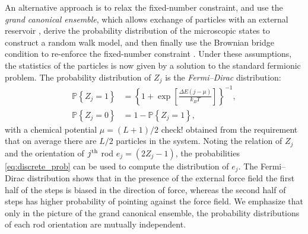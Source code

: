\documentclass[aps,showpacs,twocolumn,floatfix,prx,superscriptaddress]{revtex4-1}
\begin{document}
An alternative approach is to relax the fixed-number constraint, and use
the \emph{grand canonical ensemble}, which allows exchange of particles with
an external reservoir \cite{Chandler1987,Huang2001}, derive the probability
distribution of the microscopic states to construct a random walk model, and
then finally use the Brownian bridge condition to re-enforce the fixed-number constraint
\cite{Lin2015}. Under these assumptions, the statistics of the particles is now given by a solution to the standard fermionic problem.
The probability distribution of $Z_j$  is the {\em Fermi--Dirac} distribution:
\cite{Chandler1987,Lin2015}
\begin{subequations}
    \label{eq:discrete_prob}
    \begin{align}
        \mathbb{P} \left\{ Z_j = 1\right\} & =  \left\{1+\exp\left[\frac{ \Delta
                    E \left(j - \mu \right) }{k_B T}\right]\right\}^{-1}, \\
        \mathbb{P} \left\{ Z_j = 0\right\} & = 1 - \mathbb{P} \left\{ Z_j =
            1\right\},
    \end{align}
\end{subequations}
with a chemical potential $\mu = (L+1)/2$ {\color{red} check!} obtained from the requirement that on average there are $L/2$ particles in the system.
Noting the relation of $Z_j$ and the orientation of $j^{\rm
    th}$ rod $e_j = \left(2Z_j -1\right)$, the probabilities
\eqref{eq:discrete_prob} can be used to compute the distribution of $e_j$. The Fermi--Dirac distribution shows that in the presence of the external force field the first half of the steps is biased in the direction of force, whereas the second half of steps has higher probability of pointing against the force field.
We emphasize that only in the
picture of the grand canonical ensemble, the probability distributions of each rod orientation
are mutually independent.%
\end{document}
